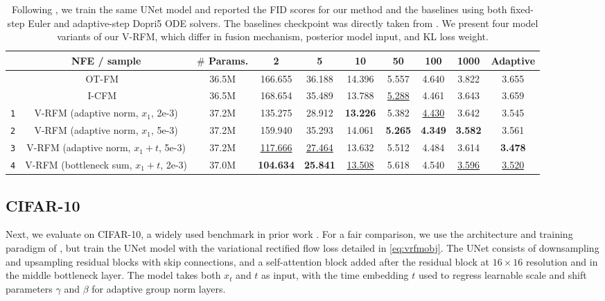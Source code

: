 \begin{table*}[t]
\vspace{-3mm}
    \small
    \centering
    \setlength{\tabcolsep}{4pt}
    \begin{tabular}{cccccccccc}
        \toprule
        & NFE / sample & $\#$ Params. & 2 & 5 & 10 & 50 & 100 & 1000 & Adaptive \\
        \midrule
        & OT-FM ~\citep{LipmanICLR2023} & 36.5M & 166.655 & 36.188 & 14.396 & 5.557 & 4.640 & 3.822 & 3.655\\
        & I-CFM ~\citep{tongimproving} & 36.5M & 168.654 & 35.489 & 13.788 & \underline{5.288} & 4.461 & 3.643 & 3.659 \\
        \midrule
        \texttt{1}& V-RFM (adaptive norm, $x_1$, 2e-3)& 37.2M & 135.275 & 28.912 & \textbf{13.226} & 5.382 & \underline{4.430} & 3.642 & 3.545\\
        \texttt{2}& V-RFM (adaptive norm, $x_1$, 5e-3)& 37.2M & 159.940 & 35.293 & 14.061 & \textbf{5.265} & \textbf{4.349} & \textbf{3.582} & 3.561\\
        \texttt{3}& V-RFM (adaptive norm, $x_1 + t$, 5e-3)& 37.2M  & \underline{117.666} & \underline{27.464} & 13.632 & 5.512 & 4.484 & 3.614 & \textbf{3.478}\\
        \texttt{4}& V-RFM (bottleneck sum, $x_1 + t$, 2e-3)& 37.0M  & \textbf{104.634} & \textbf{25.841} & \underline{13.508} & 5.618 & 4.540 & \underline{3.596} & \underline{3.520}\\
        \bottomrule
    \end{tabular}
    \vspace{-0.7em}
    \caption{Following \citet{tongimproving}, we train the same UNet model and reported the FID scores for our method and the baselines using both fixed-step Euler and adaptive-step Dopri5 ODE solvers. The baselines checkpoint was directly taken from \citet{tongimproving}. We present four model variants of our V-RFM, which differ in fusion mechanism, posterior model input, and KL loss weight. }
    \label{tab:cifar10}
    \vspace{-1em}
\end{table*}


\subsection{CIFAR-10}
\label{sec:cifar10}


Next, we evaluate on  CIFAR-10, a widely used benchmark in prior work \citep{LipmanICLR2023, tongimproving}. For a fair comparison, we use the architecture and training paradigm of \citet{tongimproving}, but train the UNet model with the variational rectified flow loss detailed in \cref{eq:vrfmobj}. The UNet consists of downsampling and upsampling residual blocks with skip connections, and a self-attention block  added after the residual block at $16 \times 16$ resolution and in the middle bottleneck layer. The model takes both \(x_t\) and \(t\) as input, with the time embedding $t$ used to regress learnable scale and shift parameters \(\gamma\) and \(\beta\) for adaptive group norm layers.


